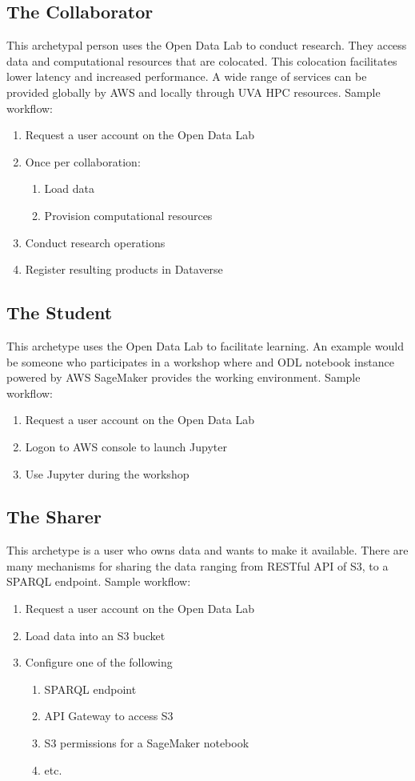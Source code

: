 \subsection*{The Collaborator}
This archetypal person uses the Open Data Lab to conduct research. They access data and computational resources that are colocated. This colocation facilitates lower latency and increased performance. A wide range of services can be provided globally by AWS and locally through UVA HPC resources. Sample workflow:
\begin{enumerate}
\item Request a user account on the Open Data Lab
\item Once per collaboration:
\begin{enumerate}
\item Load data 
\item Provision computational resources
\end{enumerate}
\item Conduct research operations
\item Register resulting products in Dataverse
\end{enumerate}

\subsection*{The Student}
This archetype uses the Open Data Lab to facilitate learning. An example would be someone who participates in a workshop where and ODL notebook instance powered by AWS SageMaker provides the working environment. Sample workflow:
\begin{enumerate}
\item Request a user account on the Open Data Lab
\item Logon to AWS console to launch Jupyter
\item Use Jupyter during the workshop
\end{enumerate}

\subsection*{The Sharer}
This archetype is a user who owns data and wants to make it available. There are many mechanisms for sharing the data ranging from RESTful API of S3, to a SPARQL endpoint. Sample workflow:
\begin{enumerate}
\item Request a user account on the Open Data Lab
\item Load data into an S3 bucket
\item Configure one of the following
\begin{enumerate}
\item SPARQL endpoint
\item API Gateway to access S3
\item S3 permissions for a SageMaker notebook
\item etc.
\end{enumerate}
\end{enumerate}


